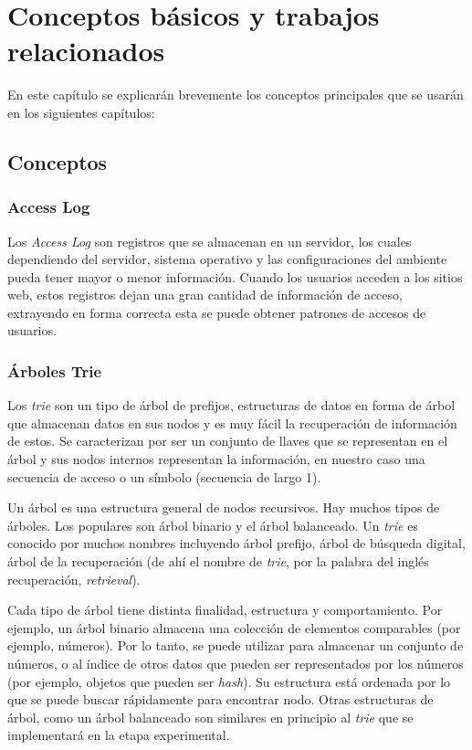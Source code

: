 \chapter[Conceptos Básicos]{Conceptos básicos y trabajos relacionados} \label{ch:Conceptos-Basicos}





En este capítulo se explicarán brevemente los conceptos principales que se usarán en los siguientes capítulos:


\section{Conceptos}

\subsection{Access Log}\label{concept-accesslog}

Los \emph{Access Log} son registros que se almacenan en un servidor, los cuales dependiendo del servidor, sistema operativo y las configuraciones del ambiente pueda tener mayor o menor información. Cuando los usuarios acceden a los sitios web, estos registros dejan una gran cantidad de información de acceso, extrayendo en forma correcta esta  se puede obtener patrones de accesos de usuarios. 


\subsection{Árboles Trie} \label{concept-trie}

Los \emph{trie} son un tipo de árbol de prefijos, estructuras de datos en forma de árbol que almacenan datos en sus nodos y es muy fácil la recuperación de información de estos. Se caracterizan por ser un conjunto de llaves que se representan en el árbol y sus nodos internos representan la información, en nuestro caso una secuencia de acceso o un símbolo (secuencia de largo 1). 

Un árbol es una estructura general de nodos recursivos. Hay muchos tipos de árboles. Los populares son árbol binario y el árbol balanceado. Un \emph{trie} es conocido por muchos nombres incluyendo árbol prefijo, árbol de búsqueda digital, árbol de la recuperación (de ahí el nombre de \textquotedbl \emph{trie}\textquotedbl, por la palabra del inglés recuperación, \emph{retrieval}).

Cada tipo de árbol tiene distinta finalidad, estructura y comportamiento. Por ejemplo, un árbol binario almacena una colección de elementos comparables (por ejemplo, números). Por lo tanto, se puede utilizar para almacenar un conjunto de números, o al índice de otros datos que pueden ser representados por los números (por ejemplo, objetos que pueden ser \emph{hash}). Su estructura está ordenada por lo que se puede buscar rápidamente para encontrar nodo. Otras estructuras de árbol, como un árbol balanceado son similares en principio al \emph{trie} que se implementará en la etapa experimental.

